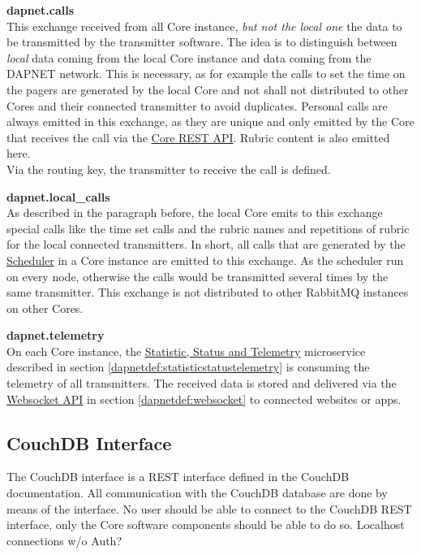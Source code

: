 \textbf{dapnet.calls}\\
This exchange received from all Core instance, \textit{but not the local one} the data to be transmitted by the transmitter software. The idea is to distinguish between \textit{local} data coming from the local Core instance and data coming from the DAPNET network. This is necessary, as for example the calls to set the time on the pagers are generated by the local Core and not shall not distributed to other Cores and their connected transmitter to avoid duplicates.
Personal calls are always emitted in this exchange, as they are unique and only emitted by the Core that receives the call via the \hyperref[dapnetdef:corerestapi]{Core REST API}.
Rubric content is also emitted here.\\
Via the routing key, the transmitter to receive the call is defined. 

\textbf{dapnet.local\_calls}\\
As described in the paragraph before, the local Core emits to this exchange special calls like the time set calls and the rubric names and repetitions of rubric for the local connected transmitters.
In short, all calls that are generated by the \hyperref[dapnetdef:other:scheduler]{Scheduler} in a Core instance are emitted to this exchange. As the scheduler run on every node, otherwise the calls would be transmitted several times by the same transmitter.
This exchange is not distributed to other RabbitMQ instances on other Cores.

\textbf{dapnet.telemetry}\\
On each Core instance, the \hyperref[dapnetdef:statisticstatustelemetry]{Statistic, Status and Telemetry} microservice described in section \ref{dapnetdef:statisticstatustelemetry} is consuming the telemetry of all transmitters. The received data is stored and delivered via the \hyperref[dapnetdef:websocket]{Websocket API} in section \ref{dapnetdef:websocket} to connected websites or apps.

\subsection{CouchDB Interface}
\label{dapnetdef:couchdbinterface}
The CouchDB interface is a REST interface defined in the CouchDB documentation. All communication with the CouchDB database are done by means of the interface. No user should be able to connect to the CouchDB REST interface, only the Core software components should be able to do so.
 Localhost connections w/o Auth?

